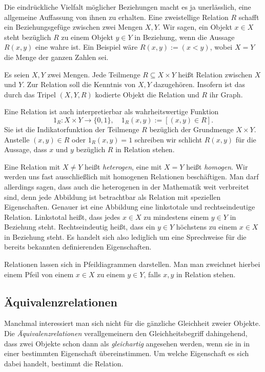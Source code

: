 Die eindrückliche Vielfalt möglicher Beziehungen macht es ja
unerlässlich, eine allgemeine Auffassung von ihnen zu erhalten.
Eine zweistellige Relation $R$ schafft ein Beziehungsgefüge zwischen
zwei Mengen $X,Y$. Wir sagen, ein Objekt $x\in X$ steht bezüglich
$R$ zu einem Objekt $y\in Y$ in Beziehung, wenn die Aussage $R(x,y)$
eine wahre ist. Ein Beispiel wäre $R(x,y):=(x<y)$, wobei $X=Y$ die Menge
der ganzen Zahlen sei.

\begin{Definition}\newlinefirst
Es seien $X,Y$ zwei Mengen. Jede Teilmenge $R\subseteq X\times Y$ heißt
Relation zwischen $X$ und $Y$. Zur Relation soll die Kenntnis von
$X,Y$ dazugehören. Insofern ist das durch das Tripel $(X,Y,R)$ kodierte
Objekt die Relation und $R$ ihr Graph.
\end{Definition}

\noindent
Eine Relation ist auch interpretierbar als wahrheitswertige Funktion
\[1_R\colon X\times Y\to\{0,1\},\quad 1_R(x,y):=[(x,y)\in R].\]
Sie ist die Indikatorfunktion der Teilmenge $R$ bezüglich der
Grundmenge $X\times Y$. Anstelle $(x,y)\in R$ oder $1_R(x,y)=1$
schreiben wir schlicht $R(x,y)$ für die Aussage, dass $x$ und $y$
bezüglich $R$ in Relation stehen.

Eine Relation mit $X\ne Y$ heißt \emph{heterogen}, eine mit
$X=Y$ heißt \emph{homogen}. Wir werden uns fast ausschließlich mit
homogenen Relationen beschäftigen. Man darf allerdings sagen, dass
auch die heterogenen in der Mathematik weit verbreitet sind, denn
jede Abbildung ist betrachtbar als Relation mit speziellen
Eigenschaften. Genauer ist eine Abbildung eine linkstotale und
rechtseindeutige Relation. Linkstotal heißt, dass jedes $x\in X$
zu mindestens einem $y\in Y$ in Beziehung steht. Rechtseindeutig heißt,
dass ein $y\in Y$ höchstens zu einem $x\in X$ in Beziehung steht. Es
handelt sich also lediglich um eine Sprechweise für die bereits
bekannten definierenden Eigenschaften.

Relationen lassen sich in Pfeildiagrammen darstellen. Man man zweichnet
hierbei einem Pfeil von einem $x\in X$ zu einem $y\in Y$, falls $x,y$
in Relation stehen.

\subsection{Äquivalenzrelationen}

Manchmal interessiert man sich nicht für die gänzliche Gleichheit
zweier Objekte. Die \emph{Äquivalenzrelationen}%
 verallgemeinern den
Gleichheitsbegriff dahingehend, dass zwei Objekte schon dann als
\emph{gleichartig} angesehen werden, wenn sie in
in einer bestimmten Eigenschaft übereinstimmen. Um welche Eigenschaft
es sich dabei handelt, bestimmt die Relation.

